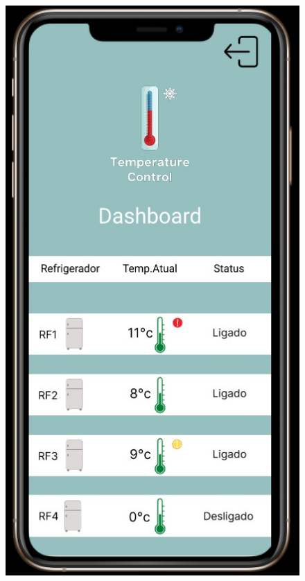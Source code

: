 \begin{figure}
\begin{minipage}{0.5\textwidth}
            \includegraphics[height=0.4\textheight]{img/mobile/dashboard_1.jpeg}
            \label{fig:mobileDashboard1}
        \end{minipage}
    \end{figure}

